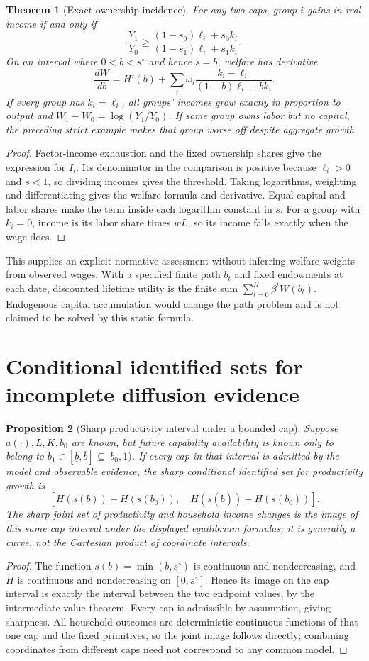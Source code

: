 \documentclass[11pt]{article}
\newtheorem{theorem}{Theorem}
\newtheorem{proposition}[theorem]{Proposition}
\theoremstyle{remark}\newtheorem{remark}[theorem]{Remark}
\begin{document}
\begin{theorem}[Exact ownership incidence]
For any two caps, group $i$ gains in real income if and only if
\[
 \frac{Y_1}{Y_0}\ge
 \frac{(1-s_0)\ell_i+s_0k_i}{(1-s_1)\ell_i+s_1k_i}.
\]
On an interval where $0<b<s^\circ$ and hence $s=b$, welfare has derivative
\[
 \frac{dW}{db}=H'(b)+\sum_i\omega_i
 \frac{k_i-\ell_i}{(1-b)\ell_i+bk_i}.
\]
If every group has $k_i=\ell_i$, all groups' incomes grow exactly in proportion to output and $W_1-W_0=\log(Y_1/Y_0)$. If some group owns labor but no capital, the preceding strict example makes that group worse off despite aggregate growth.
\end{theorem}
\begin{proof}
Factor-income exhaustion and the fixed ownership shares give the expression for $I_i$. Its denominator in the comparison is positive because $\ell_i>0$ and $s<1$, so dividing incomes gives the threshold. Taking logarithms, weighting and differentiating gives the welfare formula and derivative. Equal capital and labor shares make the term inside each logarithm constant in $s$. For a group with $k_i=0$, income is its labor share times $wL$, so its income falls exactly when the wage does.
\end{proof}

This supplies an explicit normative assessment without inferring welfare weights from observed wages. With a specified finite path $b_t$ and fixed endowments at each date, discounted lifetime utility is the finite sum $\sum_{t=0}^H\beta^t W(b_t)$. Endogenous capital accumulation would change the path problem and is not claimed to be solved by this static formula.

\section*{Conditional identified sets for incomplete diffusion evidence}
\begin{proposition}[Sharp productivity interval under a bounded cap]
Suppose $a(\cdot),L,K,b_0$ are known, but future capability availability is known only to belong to $b_1\in[\underline b,\overline b]\subseteq[b_0,1)$. If every cap in that interval is admitted by the model and observable evidence, the sharp conditional identified set for productivity growth is
\[
 [H(s(\underline b))-H(s(b_0)),\quad
 H(s(\overline b))-H(s(b_0))].
\]
The sharp joint set of productivity and household income changes is the image of this same cap interval under the displayed equilibrium formulas; it is generally a curve, not the Cartesian product of coordinate intervals.
\end{proposition}
\begin{proof}
The function $s(b)=\min(b,s^\circ)$ is continuous and nondecreasing, and $H$ is continuous and nondecreasing on $[0,s^\circ]$. Hence its image on the cap interval is exactly the interval between the two endpoint values, by the intermediate value theorem. Every cap is admissible by assumption, giving sharpness. All household outcomes are deterministic continuous functions of that one cap and the fixed primitives, so the joint image follows directly; combining coordinates from different caps need not correspond to any common model.
\end{proof}
\end{document}
